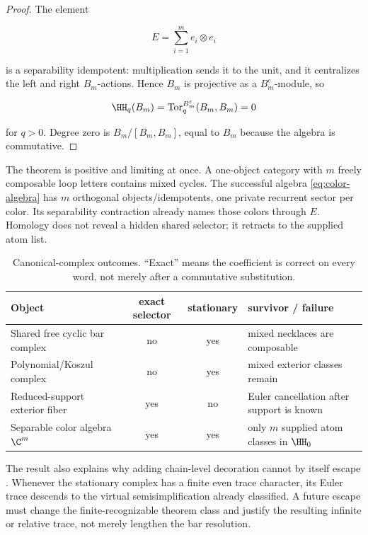 \begin{proof}
The element

\[
 E=\sum_{i=1}^m e_i\otimes e_i
\]

is a separability idempotent: multiplication sends it to the unit, and it
centralizes the left and right \(B_m\)-actions.  Hence \(B_m\) is projective as
a \(B_m^e\)-module, so

\[
 \HH_q(B_m)=\operatorname{Tor}^{B_m^e}_q(B_m,B_m)=0
\]

for \(q>0\).  Degree zero is \(B_m/[B_m,B_m]\), equal to \(B_m\) because the
algebra is commutative.
\end{proof}

The theorem is positive and limiting at once.  A one-object category with
\(m\) freely composable loop letters contains mixed cycles.  The successful
algebra \eqref{eq:color-algebra} has \(m\) orthogonal objects/idempotents, one
private recurrent sector per color.  Its separability contraction already
names those colors through \(E\).  Homology does not reveal a hidden shared
selector; it retracts to the supplied atom list.

\begin{table}[t]
\centering
\small
\caption{Canonical-complex outcomes.  “Exact” means the coefficient is
correct on every word, not merely after a commutative substitution.}
\label{tab:complex-audit}
\begin{tabularx}{\textwidth}{L{40mm} c c Y}
\toprule
Object & exact selector & stationary & survivor / failure \\
\midrule
Shared free cyclic bar complex & no & yes & mixed necklaces are composable \\
Polynomial/Koszul complex & no & yes & mixed exterior classes remain \\
Reduced-support exterior fiber & yes & no & Euler cancellation after support is known \\
Separable color algebra \(\C^m\) & yes & yes & only \(m\) supplied atom classes in \(\HH_0\) \\
\bottomrule
\end{tabularx}
\end{table}

The result also explains why adding chain-level decoration cannot by itself
escape .  Whenever the stationary complex has a
finite even trace character, its Euler trace descends to the virtual
semisimplification already classified.  A future escape must change the
finite-recognizable theorem class and justify the resulting infinite or
relative trace, not merely lengthen the bar resolution.
